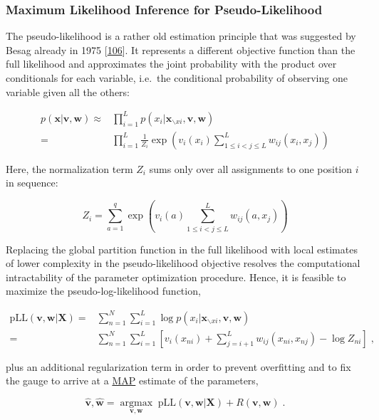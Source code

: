 \documentclass[11pt,a4paper,twoside]{book}
\newcommand{\seq}{\mathbf{x}}
\renewcommand{\v}{\mathbf{v}}
\newcommand{\w}{\mathbf{w}}
\theoremstyle{definition}
\theoremstyle{definition}
\theoremstyle{remark}
\begin{document}
\subsubsection{Maximum Likelihood Inference for
Pseudo-Likelihood}\label{pseudo-likelihood}

The pseudo-likelihood is a rather old estimation principle that was
suggested by Besag already in 1975
{[}\protect\hyperlink{ref-Besag1975}{106}{]}. It represents a different
objective function than the full likelihood and approximates the joint
probability with the product over conditionals for each variable,
i.e.~the conditional probability of observing one variable given all the
others:

\begin{align}
  p(\seq | \v,\w) \approx&   \prod_{i=1}^L p(x_i | \seq_{\backslash xi}, \v,\w) \nonumber \\
                        =&  \prod_{i=1}^L \frac{1}{Z_i} \exp \left(  v_i(x_i) \sum_{1 \leq i < j \leq L}^L w_{ij}(x_i, x_j) \right)
\end{align}

Here, the normalization term \(Z_i\) sums only over all assignments to
one position \(i\) in sequence:

\begin{equation}
  Z_i = \sum_{a=1}^{q} \exp \left( v_i(a) \sum_{1 \leq i < j \leq L}^L w_{ij}(a, x_j) \right)
\label{eq:partition-fct-pll}
\end{equation}

Replacing the global partition function in the full likelihood with
local estimates of lower complexity in the pseudo-likelihood objective
resolves the computational intractability of the parameter optimization
procedure. Hence, it is feasible to maximize the pseudo-log-likelihood
function,

\begin{align}
    \text{pLL}(\v, \w | \mathbf{X}) =& \sum_{n=1}^N \sum_{i=1}^L \log p(x_i | \seq_{\backslash xi}, \v,\w) \nonumber \\
    =& \sum_{n=1}^N \sum_{i=1}^L  \left[ v_i(x_{ni}) + \sum_{j=i+1}^L  w_{ij}(x_{ni}, x_{nj}) - \log Z_{ni} \right] \;,
\end{align}

plus an additional regularization term in order to prevent overfitting
and to fix the gauge to arrive at a \protect\hyperlink{abbrev}{MAP}
estimate of the parameters,

\begin{equation}
    \hat{\v}, \hat{\w} = \underset{\v, \w}{\operatorname{argmax}} \; \text{pLL}(\v, \w | \mathbf{X}) + R(\v, \w) \; .
\end{equation}
\end{document}
